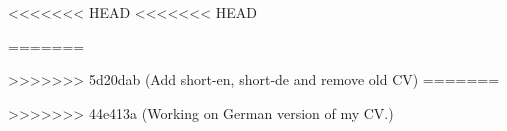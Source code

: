 \documentclass{resume}
\author{Mehrshad Lotfi Foroushani}
\begin{document}
  \maketitle
  \vspace{-0.5cm}
  
<<<<<<< HEAD
<<<<<<< HEAD
  
  
  
  
  
  
=======
  
  
  
  
  
  
>>>>>>> 5d20dab (Add short-en, short-de and remove old CV)
=======
  
  
  
  
  
  
>>>>>>> 44e413a (Working on German version of my CV.)
\end{document}
